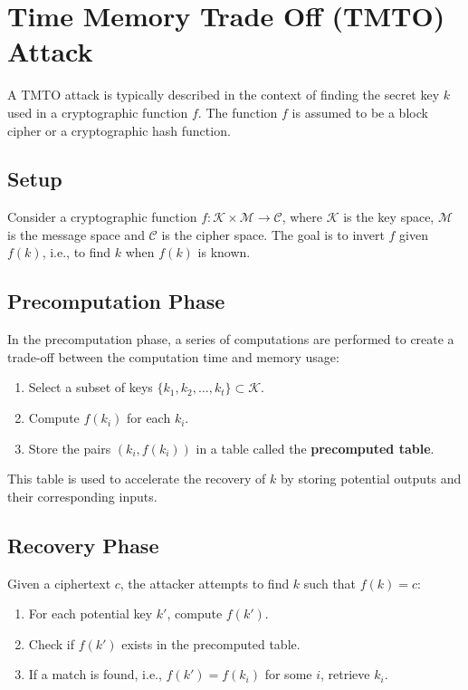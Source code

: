 \section{Time Memory Trade Off (TMTO) Attack}
A TMTO attack is typically described in the context of finding the secret key $k$ used in a cryptographic function $f$. The function $f$ is assumed to be a block cipher or a cryptographic hash function.

\subsection*{Setup}
Consider a cryptographic function $f: \mathcal{K}\times\mathcal{M} \rightarrow \mathcal{C}$, where $\mathcal{K}$ is the key space, $\mathcal{M}$ is the message space and $\mathcal{C}$ is the cipher space. The goal is to invert $f$ given $f(k)$, i.e., to find $k$ when $f(k)$ is known. 

\subsection*{Precomputation Phase}
In the precomputation phase, a series of computations are performed to create a trade-off between the computation time and memory usage:

\begin{enumerate}
	\item Select a subset of keys $\{k_1, k_2, \dots, k_t\} \subset \mathcal{K}$.
	\item Compute $f(k_i)$ for each $k_i$.
	\item Store the pairs $(k_i, f(k_i))$ in a table called the \textbf{precomputed table}.
\end{enumerate}

This table is used to accelerate the recovery of $k$ by storing potential outputs and their corresponding inputs.

\subsection*{Recovery Phase}
Given a ciphertext $c$, the attacker attempts to find $k$ such that $f(k) = c$:

\begin{enumerate}
	\item For each potential key $k'$, compute $f(k')$.
	\item Check if $f(k')$ exists in the precomputed table.
	\item If a match is found, i.e., $f(k') = f(k_i)$ for some $i$, retrieve $k_i$.
\end{enumerate}

